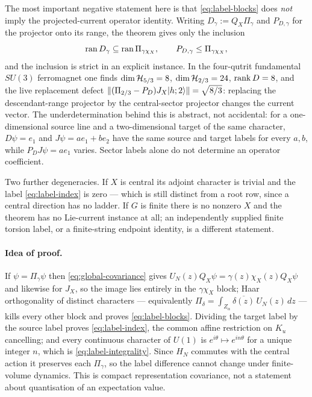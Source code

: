 \begin{scope}
\label{scope:sector-label}
The most important negative statement here is that
\cref{eq:label-blocks} does \emph{not} imply the projected-current operator
identity. Writing $D_\gamma:=Q_X\Pi_\gamma$ and $P_{D,\gamma}$ for the
projector onto its range, the theorem gives only the inclusion
\begin{equation}
  \operatorname{ran} D_\gamma\subseteq\operatorname{ran}\Pi_{\gamma\chi_X},
  \qquad
  P_{D,\gamma}\le\Pi_{\gamma\chi_X},
  \label{eq:descendant-finer}
\end{equation}
and the inclusion is strict in an explicit instance. In the four-qutrit
fundamental $SU(3)$ ferromagnet one finds
$\dim\mathcal{H}_{5/3}=8$, $\dim\mathcal{H}_{2/3}=24$, $\operatorname{rank} D=8$, and the live
replacement defect
$\lVert (\Pi_{2/3}-P_D)J_X|h;2\rangle\rVert=\sqrt{8/3}$: replacing the
descendant-range projector by the central-sector projector changes the current
vector. The underdetermination behind this is abstract, not accidental: for a
one-dimensional source line and a two-dimensional target of the same
character, $D\psi=e_1$ and $J\psi=ae_1+be_2$ have the same source and target
labels for every $a,b$, while $P_DJ\psi=ae_1$ varies. Sector labels alone do
not determine an operator coefficient.

Two further degeneracies. If $X$ is central its adjoint character is trivial
and the label \cref{eq:label-index} is zero --- which is still distinct from a
root row, since a central direction has no ladder. If $G$ is finite there is
no nonzero $X$ and the theorem has no Lie-current instance at all; an
independently supplied finite torsion label, or a finite-string endpoint
identity, is a different statement.
\end{scope}

\paragraph{Idea of proof.} If $\psi=\Pi_\gamma\psi$ then
\cref{eq:global-covariance} gives
$U_N(z)Q_X\psi=\gamma(z)\chi_X(z)Q_X\psi$ and likewise for $J_X$, so the
image lies entirely in the $\gamma\chi_X$ block; Haar orthogonality of
distinct characters --- equivalently
$\Pi_\delta=\int_{Z_\alpha}\overline{\delta(z)}\,U_N(z)\,dz$ --- kills every
other block and proves \cref{eq:label-blocks}. Dividing the target label by
the source label proves \cref{eq:label-index}, the common affine restriction
on $K_u$ cancelling; and every continuous character of $U(1)$ is
$e^{i\theta}\mapsto e^{in\theta}$ for a unique integer $n$, which is
\cref{eq:label-integrality}. Since $H_N$ commutes with the central action it
preserves each $\Pi_\gamma$, so the label difference cannot change under
finite-volume dynamics. This is compact representation covariance, not a
statement about quantisation of an expectation value.


